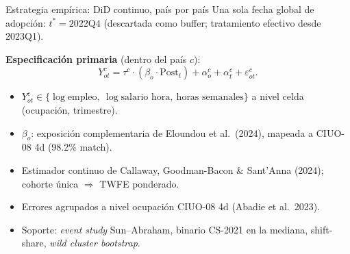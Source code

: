 \documentclass[aspectratio=169,11pt]{beamer}
\newcommand{\cit}[1]{\textcolor{pgray}{\small(#1)}}
\begin{document}
\begin{frame}{Estrategia empírica: DiD continuo, país por país}
\small
\vspace{0.1em}
Una sola fecha global de adopción: $t^*=2022\text{Q4}$ (descartada como buffer; tratamiento efectivo desde 2023Q1).

\vspace{0.3em}
\textbf{Especificación primaria} (dentro del país $c$):
\vspace{-0.4em}
\[
Y^c_{ot} = \tau^c \cdot (\beta_o \cdot \text{Post}_t) + \alpha^c_o + \alpha^c_t + \varepsilon^c_{ot}.
\]

\vspace{-0.2em}
\begin{itemize}
  \item $Y^c_{ot}\in\{\log\text{empleo},\ \log\text{salario hora},\ \text{horas semanales}\}$ a nivel celda (ocupación, trimestre).
  \item $\beta_o$: exposición complementaria de Eloundou et al.\ \cit{2024}, mapeada a CIUO-08 4d (98.2\% match).
  \item Estimador continuo de Callaway, Goodman-Bacon \& Sant'Anna \cit{2024}; cohorte única $\Rightarrow$ TWFE ponderado.
  \item Errores agrupados a nivel ocupación CIUO-08 4d \cit{Abadie et al.\ 2023}.
  \item Soporte: \emph{event study} Sun--Abraham, binario CS-2021 en la mediana, shift-share, \emph{wild cluster bootstrap}.
\end{itemize}
\end{frame}
\end{document}
